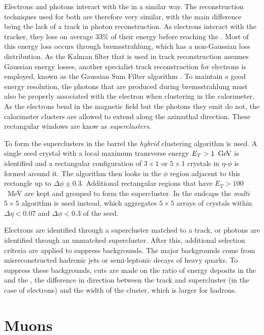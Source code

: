 Electrons and photons interact with the \ECAL in a similar way.
The reconstruction techniques used for both are therefore very similar, with
the main difference being the lack of a track in photon reconstruction.
As electrons interact with the tracker, they lose on average $33\%$ of
their energy before reaching the \ECAL \cite{1748-0221-10-06-P06005}.
Most of this energy loss occurs through bremsstrahlung, which has a
non-Gaussian loss distribution. As the Kalman filter that is used in
track reconstruction assumes Gaussian energy losses, another specialist
track reconstruction for electrons is employed, known as the Gaussian
Sum Filter algorithm \cite{Adam:815410}. To maintain a good energy
resolution, the photons that are produced during bremsstrahlung must
also be properly associated with the electron when clustering in the
calorimeter. As the electrons bend in the magnetic field but the
photons they emit do not, the calorimeter clusters are allowed to
extend along the azimuthal direction. These rectangular \ECAL windows
are know as \emph{superclusters}.

To form the superclusters in the barrel the \emph{hybrid} clustering
algorithm is used. A single seed crystal with a local maximum
transverse energy $E_T>1~\mathrm{\,Ge\kern -0.1em V}$ is identified and a rectangular
configuration of $3\times 1$ or $5\times 1$ crystals in $\eta$-$\phi$
is formed around it. The algorithm then looks in the $\phi$ region
adjacent to this rectangle up to $\Delta\phi\pm 0.3$.
Additional rectangular regions that have $E_T>100$~MeV are kept and
grouped to form the supercluster. In the endcaps the \emph{multi $5\times
5$} algorithm is used instead, which aggregates $5\times 5$ arrays of
crystals within $\Delta\eta<0.07$ and $\Delta\phi<0.3$ of the seed.

Electrons are identified through a supercluster matched to a track, or
photons are identified through an unmatched supercluster. After
this, additional selection criteria are applied to suppress
backgrounds. The major backgrounds come from misreconstructed hadronic
jets or semi-leptonic decays of heavy quarks. To suppress these
backgrounds, cuts
are made on the ratio of energy deposits in the \HCAL and the \ECAL, the
difference in direction between the track and supercluster (in the
case of electrons) and the width of the cluster, which is larger for
hadrons.

\section{Muons}
\label{sec:muons_reco}

